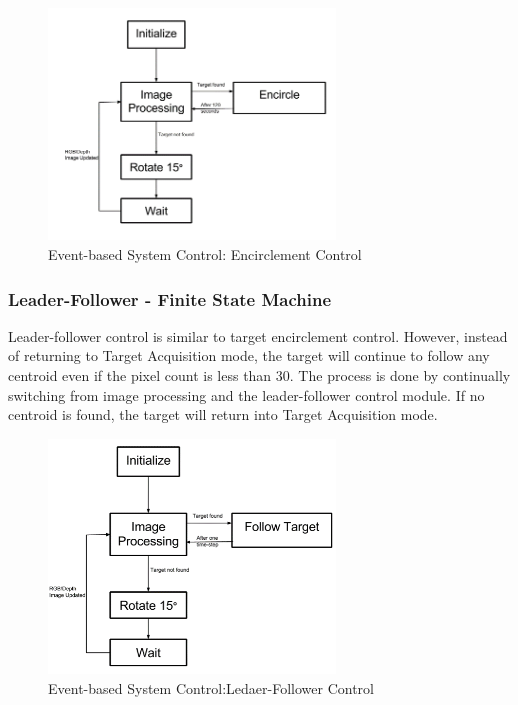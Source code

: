 \documentclass[conference]{IEEEtran}
\begin{document}
\begin{figure}[htbp]
\begin{center}
\includegraphics[width=3in]{9b}
\caption{Event-based System Control: Encirclement Control} \label{fig:9b}
\end{center}
\end{figure}

\subsubsection{Leader-Follower - Finite State Machine}

Leader-follower control is similar to target encirclement control. However, instead of returning to Target Acquisition mode, the target will continue to follow any centroid even if the pixel count is less than 30. The process is done by continually switching from image processing and the leader-follower control module. If no centroid is found, the target will return into Target Acquisition mode.


\begin{figure}[htbp] 
\begin{center}
\includegraphics[width=3in]{10b}
\caption{Event-based System Control:Ledaer-Follower Control} \label{fig:10b}
\end{center}
\end{figure}
\end{document}
